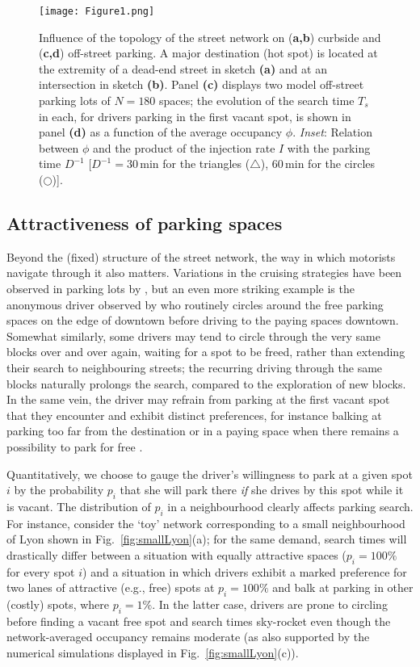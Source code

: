 \documentclass[trsc,reprint]{informs3}
\begin{document}
\begin{figure}[!htb]
    \centering
 
        \texttt{[image: Figure1.png]}
\caption{Influence of the topology of the street network on (\textbf{a,b}) curbside and  (\textbf{c,d}) off-street parking. A major destination (hot spot) is located at the extremity of a dead-end street in sketch \textbf{(a)} and at an intersection in sketch \textbf{(b)}. Panel \textbf{(c)} displays two model off-street parking lots of $N=180$ spaces; the evolution of the search time $T_s$ in each, for drivers parking in the first vacant spot, is shown in panel \textbf{(d)} as a function of the average occupancy $\phi$.  \emph{Inset}: Relation between $\phi$ and the product of the injection rate $I$ with the parking time $D^{-1}$ [$D^{-1}=30\,\mathrm{min}$ for the triangles ($\triangle$), $60\,\mathrm{min}$ for the circles ($\bigcirc$)]. }
\label{fig:figure1}
\end{figure}


\subsection{Attractiveness of parking spaces}


Beyond the (fixed) structure of the street network, the way in which motorists navigate through it also matters. Variations in the cruising strategies have been observed in parking lots by \citet{paidi2022co2}, but an even more striking example is the anonymous
driver observed by \citet{hampshire2016analysis} who routinely circles around the free parking spaces on the edge of downtown before driving to the paying spaces downtown. Somewhat similarly,
some drivers may tend to circle through the very same blocks over and over again, waiting for a spot to be freed, rather than extending their search to neighbouring streets; the recurring
driving through the same blocks naturally prolongs the search, compared to the exploration of
new blocks. In the same vein, the driver may refrain from parking at the first vacant spot that they encounter and exhibit distinct
preferences, for instance balking at parking too far from the destination or in a paying space when there remains a possibility to
park for free \citep{weinberger2020parking}. 

Quantitatively, we choose to gauge the driver's willingness to park at a given spot $i$ by the probability $p_i$ that she will park there \emph{if} she drives by this spot while it is vacant. The distribution of $p_i$ in a neighbourhood clearly affects parking search. For instance, consider the `toy' network corresponding to a small neighbourhood of Lyon shown in Fig.~\ref{fig:smallLyon}(a); for the same demand, search times will drastically differ between a situation with equally attractive spaces
($p_i=100\%$ for every spot $i$) and a situation in which drivers exhibit a marked preference for two lanes of attractive (e.g., free) spots at $p_i=100\%$ and balk at parking in other (costly) spots, where $p_i=1\%$. In the latter case, drivers are prone to circling before finding a vacant free spot and search times sky-rocket even
though the network-averaged occupancy remains moderate (as also supported by the numerical simulations displayed in Fig.~\ref{fig:smallLyon}(c)).
\end{document}
